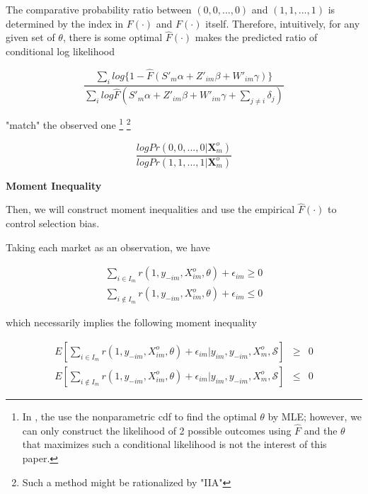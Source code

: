 \documentclass[a4paper]{article}
\begin{document}
The comparative probability ratio between $(0,0,...,0)$ and $(1, 1, ..., 1)$ is determined by the index in $F(\cdot)$ and $F(\cdot)$ itself. Therefore, intuitively, for any given set of $\theta$, there is some optimal $\hat{F}(\cdot)$ makes the predicted ratio of conditional log likelihood 

$$\dfrac{\sum_i log \{1 - \hat{F}(S'_m\alpha+Z'_{im}\beta+W'_{im}\gamma)\}}{\sum_i log \hat{F}(S'_m\alpha+Z'_{im}\beta+W'_{im}\gamma + \sum_{j\neq i}\delta_{j})}$$

"match" the observed one \footnote{In \cite{cosslett1983distribution}, the use the nonparametric cdf to find the optimal $\theta$ by MLE; however, we can only construct the likelihood of 2 possible outcomes using $\hat{F}$ and the $\theta$ that maximizes such a conditional likelihood is not the interest of this paper.}
\footnote{Such a method might be rationalized by "IIA"}

$$\dfrac{log Pr(0,0,...,0|\textbf{X}^o_m) }{log Pr(1,1,...,1|\textbf{X}^o_m)}$$




\bigskip

\textbf{Moment Inequality}

\bigskip

Then, we will construct moment inequalities and use the empirical $\hat{F}(\cdot)$ to control selection bias.

\bigskip

Taking each market as an observation, we have

\begin{equation}
\begin{array}{rcl}
\displaystyle \sum_{i \in I_m} r(1,y_{-im},X^o_{im},\theta)+ \epsilon_{im} \geq 0\\
\displaystyle \sum_{i \not\in I_m} r(1,y_{-im},X^o_{im},\theta)+ \epsilon_{im} \leq 0
\end{array}
\label{ineq_uncon}
\end{equation}


which necessarily implies the following moment inequality

\begin{equation}
\begin{array}{rcl}
E[\displaystyle \sum_{i \in I_m} r(1,y_{-im},X^o_{im},\theta)+ \epsilon_{im} | y_{im}, y_{-im}, X^o_{m},\mathcal{S}] &\geq& 0 \\ 
E[\displaystyle \sum_{i \not\in I_m} r(1,y_{-im},X^o_{im},\theta)+ \epsilon_{im} |y_{im}, y_{-im}, X^o_{m}, \mathcal{S}] &\leq& 0 
\end{array}
\nonumber
\end{equation}
\end{document}
